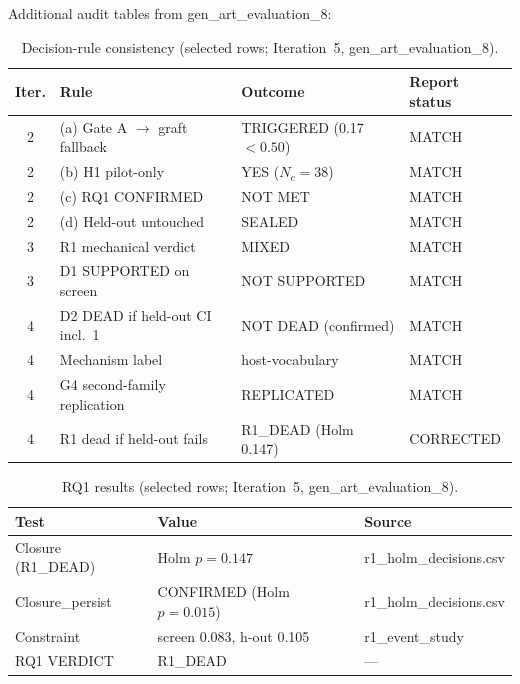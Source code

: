 \documentclass[11pt,letterpaper]{article}
\begin{document}
Additional audit tables from gen\_art\_evaluation\_8:

\begin{table}[!htbp]
\centering
\caption{Decision-rule consistency (selected rows; Iteration~5, gen\_art\_evaluation\_8).}
\label{tab:decision_rules}
{\small
\begin{tabular}{clL{4.5cm}l}
\toprule
Iter. & Rule & Outcome & Report status \\
 & (a) Gate A $\to$ graft fallback & TRIGGERED (0.17 $< 0.50$) & MATCH \\
2 & (b) H1 pilot-only & YES ($N_c = 38$) & MATCH \\
2 & (c) RQ1 CONFIRMED & NOT MET & MATCH \\
2 & (d) Held-out untouched & SEALED & MATCH \\
3 & R1 mechanical verdict & MIXED & MATCH \\
3 & D1 SUPPORTED on screen & NOT SUPPORTED & MATCH \\
4 & D2 DEAD if held-out CI incl.\ 1 & NOT DEAD (confirmed) & MATCH \\
4 & Mechanism label & host-vocabulary & MATCH \\
4 & G4 second-family replication & REPLICATED & MATCH \\
4 & R1 dead if held-out fails & R1\_DEAD (Holm 0.147) & CORRECTED \\
\bottomrule
\end{tabular}
}
\end{table}

\begin{table}[!htbp]
\centering
\caption{RQ1 results (selected rows; Iteration~5, gen\_art\_evaluation\_8).}
\label{tab:rq1_audit}
\begin{tabular}{L{2.8cm}L{3.3cm}L{3cm}}
\toprule
Test & Value & Source \\
\midrule
Closure (R1\_DEAD) & Holm $p = 0.147$ & r1\_holm\_\allowbreak decisions.csv \\
Closure\_persist & CONFIRMED (Holm $p = 0.015$) & r1\_holm\_\allowbreak decisions.csv \\
Constraint & screen 0.083, h-out 0.105 & r1\_event\_study \\
RQ1 VERDICT & R1\_DEAD & --- \\
\bottomrule
\end{tabular}
\end{table}
\end{document}
